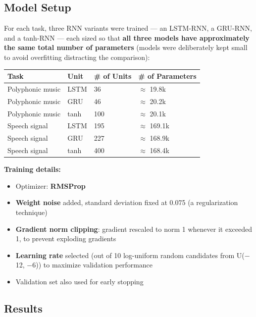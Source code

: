 \documentclass[12pt,openany]{book}
\theoremstyle{definition}
\theoremstyle{remark}
\begin{document}
\subsection{Model Setup}

For each task, three RNN variants were trained --- an LSTM-RNN, a GRU-RNN, and a tanh-RNN --- each sized so that \textbf{all three models have approximately the same total number of parameters} (models were deliberately kept small to avoid overfitting distracting the comparison):

{\small
\setlength{\tabcolsep}{3pt}
\begin{longtable}{@{}L{0.20\textwidth}L{0.22\textwidth}L{0.22\textwidth}L{0.30\textwidth}@{}}
\toprule
Task & Unit & \# of Units & \# of Parameters \\
\midrule
Polyphonic music & LSTM & 36 & \ensuremath{\approx} 19.8k \\
Polyphonic music & GRU & 46 & \ensuremath{\approx} 20.2k \\
Polyphonic music & tanh & 100 & \ensuremath{\approx} 20.1k \\
Speech signal & LSTM & 195 & \ensuremath{\approx} 169.1k \\
Speech signal & GRU & 227 & \ensuremath{\approx} 168.9k \\
Speech signal & tanh & 400 & \ensuremath{\approx} 168.4k \\
\bottomrule
\end{longtable}
}

\textbf{Training details:}
\begin{itemize}
\item Optimizer: \textbf{RMSProp}
\item \textbf{Weight noise} added, standard deviation fixed at 0.075 (a regularization technique)
\item \textbf{Gradient norm clipping}: gradient rescaled to norm 1 whenever it exceeded 1, to prevent exploding gradients
\item \textbf{Learning rate} selected (out of 10 log-uniform random candidates from U(\ensuremath{-}12, \ensuremath{-}6)) to maximize validation performance
\item Validation set also used for early stopping

\end{itemize}

\subsection{Results}
\end{document}
